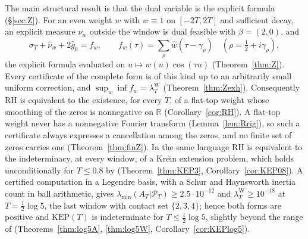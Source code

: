 \documentclass[11pt]{amsart}
\theoremstyle{definition}
\theoremstyle{remark}
\newcommand{\R}{\mathbb R}
\newcommand{\PT}{\mathcal P_T}
\newcommand{\lamW}{\lambda^{\mathrm W}_T}
\newcommand{\lamA}{\lambda_{\min}(A_T|\PT)}
\newcommand{\sT}{\sigma_T}
\newcommand{\gh}[1]{\widehat g_{#1}}
\newcommand{\nuh}{\widehat\nu}
\newcommand{\wh}{\widehat w}
\begin{document}
The main structural result is that the dual variable is the explicit formula (\S\ref{sec:Z}). For an
even weight $w$ with $w\equiv1$ on $[-2T,2T]$ and sufficient decay, an explicit measure $\nu_w$ outside
the window is dual feasible with $\beta=(2,0)$, and
\[
\sT+\nuh_w+2\gh0=f_w,\qquad f_w(\tau)=\sum_\rho\wh(\tau-\gamma_\rho)\quad(\rho=\tfrac12+i\gamma_\rho),
\]
the explicit formula evaluated on $u\mapsto w(u)\cos(\tau u)$ (Theorem~\ref{thm:Z}). Every
certificate of the complete form is of this kind up to an arbitrarily small uniform correction, and
$\sup_w\inf f_w=\lamW$ (Theorem~\ref{thm:Zexh}). Consequently RH is equivalent to the existence, for
every $T$, of a flat-top weight whose smoothing of the zeros is nonnegative on $\R$
(Corollary~\ref{cor:RH}). A flat-top weight never has a nonnegative Fourier transform
(Lemma~\ref{lem:Rrig}), so such a certificate always expresses a cancellation among the zeros, and no
finite set of zeros carries one (Theorem~\ref{thm:finZ}). In the same language RH is equivalent to the
indeterminacy, at every window, of a Kre\u{\i}n extension problem, which holds unconditionally for
$T\le0.8$ by \cite{Zhu2026} (Theorem~\ref{thm:KEP3}, Corollary~\ref{cor:KEP08}). A certified
computation in a Legendre basis, with a Schur and Haynsworth inertia count in ball arithmetic, gives
$\lamA\ge2.5\cdot10^{-12}$ and $\lamW\ge10^{-18}$ at $T=\frac12\log5$, the last window with contact set
$\{2,3,4\}$; hence both forms are positive and $\mathrm{KEP}(T)$ is indeterminate for
$T\le\frac12\log5$, slightly beyond the range of \cite{Zhu2026} (Theorems~\ref{thm:log5A},
\ref{thm:log5W}, Corollary~\ref{cor:KEPlog5}).
\end{document}
